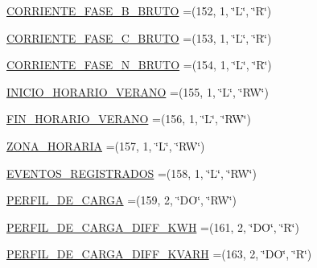 \begin{DoxyCompactItemize}
\item 
\hyperlink{enumcom_1_1eneri_1_1scorpio__metertool_1_1devices_1_1_register_a63706e81114342595320b72a929d6277}{C\+O\+R\+R\+I\+E\+N\+T\+E\+\_\+\+F\+A\+S\+E\+\_\+\+B\+\_\+\+B\+R\+U\+TO} =(152, 1, \char`\"{}L\char`\"{}, \char`\"{}R\char`\"{})
\item 
\hyperlink{enumcom_1_1eneri_1_1scorpio__metertool_1_1devices_1_1_register_ad5fbc648bde6f146dfd5d6f14f96eebf}{C\+O\+R\+R\+I\+E\+N\+T\+E\+\_\+\+F\+A\+S\+E\+\_\+\+C\+\_\+\+B\+R\+U\+TO} =(153, 1, \char`\"{}L\char`\"{}, \char`\"{}R\char`\"{})
\item 
\hyperlink{enumcom_1_1eneri_1_1scorpio__metertool_1_1devices_1_1_register_a3c4303d6587eba2318898c8c9fcba5d4}{C\+O\+R\+R\+I\+E\+N\+T\+E\+\_\+\+F\+A\+S\+E\+\_\+\+N\+\_\+\+B\+R\+U\+TO} =(154, 1, \char`\"{}L\char`\"{}, \char`\"{}R\char`\"{})
\item 
\hyperlink{enumcom_1_1eneri_1_1scorpio__metertool_1_1devices_1_1_register_a3ff46794486c7e99689aa4bfbf35dc9e}{I\+N\+I\+C\+I\+O\+\_\+\+H\+O\+R\+A\+R\+I\+O\+\_\+\+V\+E\+R\+A\+NO} =(155, 1, \char`\"{}L\char`\"{}, \char`\"{}RW\char`\"{})
\item 
\hyperlink{enumcom_1_1eneri_1_1scorpio__metertool_1_1devices_1_1_register_a807b61905cb9b519a2ba50397933e281}{F\+I\+N\+\_\+\+H\+O\+R\+A\+R\+I\+O\+\_\+\+V\+E\+R\+A\+NO} =(156, 1, \char`\"{}L\char`\"{}, \char`\"{}RW\char`\"{})
\item 
\hyperlink{enumcom_1_1eneri_1_1scorpio__metertool_1_1devices_1_1_register_a07382d5355b5f6f8578e8639f1f0b5e3}{Z\+O\+N\+A\+\_\+\+H\+O\+R\+A\+R\+IA} =(157, 1, \char`\"{}L\char`\"{}, \char`\"{}RW\char`\"{})
\item 
\hyperlink{enumcom_1_1eneri_1_1scorpio__metertool_1_1devices_1_1_register_aa05c5dd8dd00158b9bac18515fa2ed71}{E\+V\+E\+N\+T\+O\+S\+\_\+\+R\+E\+G\+I\+S\+T\+R\+A\+D\+OS} =(158, 1, \char`\"{}L\char`\"{}, \char`\"{}RW\char`\"{})
\item 
\hyperlink{enumcom_1_1eneri_1_1scorpio__metertool_1_1devices_1_1_register_af3e0dbea1a84d3d25a25801e72245fbd}{P\+E\+R\+F\+I\+L\+\_\+\+D\+E\+\_\+\+C\+A\+R\+GA} =(159, 2, \char`\"{}DO\char`\"{}, \char`\"{}RW\char`\"{})
\item 
\hyperlink{enumcom_1_1eneri_1_1scorpio__metertool_1_1devices_1_1_register_ab5dafa9cbff61fb3d477da2320c0b1b9}{P\+E\+R\+F\+I\+L\+\_\+\+D\+E\+\_\+\+C\+A\+R\+G\+A\+\_\+\+D\+I\+F\+F\+\_\+\+K\+WH} =(161, 2, \char`\"{}DO\char`\"{}, \char`\"{}R\char`\"{})
\item 
\hyperlink{enumcom_1_1eneri_1_1scorpio__metertool_1_1devices_1_1_register_a8e219570a2ed950403dc6d24d1741026}{P\+E\+R\+F\+I\+L\+\_\+\+D\+E\+\_\+\+C\+A\+R\+G\+A\+\_\+\+D\+I\+F\+F\+\_\+\+K\+V\+A\+RH} =(163, 2, \char`\"{}DO\char`\"{}, \char`\"{}R\char`\"{})

\end{DoxyCompactItemize}
